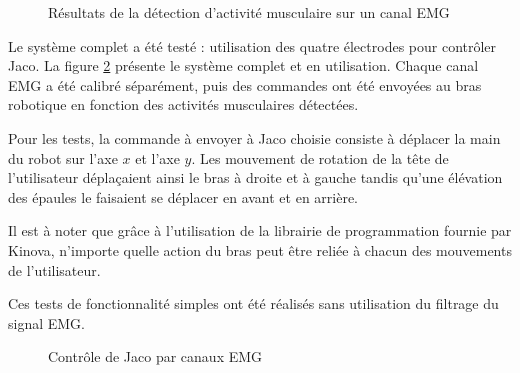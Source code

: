 \documentclass[letterpaper, twoside, 12pt, memoire, creativecommons, hyperref]{thETS}
\begin{document}
\begin{figure}
	\centering
	\caption{Résultats de la détection d'activité musculaire sur un canal EMG}
	\label{fig:onset}
\end{figure}

Le système complet a été testé : utilisation des quatre électrodes pour contrôler Jaco. La figure \ref{fig:montageglobal} présente le système complet et en utilisation. Chaque canal EMG a été calibré séparément, puis des commandes ont été envoyées au bras robotique en fonction des activités musculaires détectées. 

Pour les tests, la commande à envoyer à Jaco choisie consiste à déplacer la main du robot sur l'axe $x$ et l'axe $y$. Les mouvement de rotation de la tête de l'utilisateur déplaçaient ainsi le bras à droite et à gauche tandis qu'une élévation des épaules le faisaient se déplacer en avant et en arrière. 

Il est à noter que grâce à l'utilisation de la librairie de programmation fournie par Kinova, n'importe quelle action du bras peut être reliée à chacun des mouvements de l'utilisateur.

Ces tests de fonctionnalité simples ont été réalisés sans utilisation du filtrage du signal EMG.

\begin{figure}
	\centering
	\caption{Contrôle de Jaco par canaux EMG}
	\label{fig:montageglobal}
\end{figure}
\end{document}
